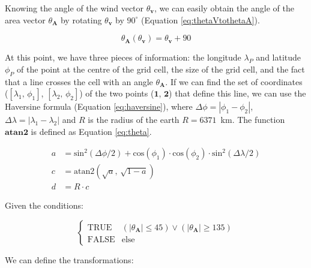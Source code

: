         Knowing the angle of the wind vector $\theta_{\mathbf{v}}$, we can easily obtain the angle of the area vector $\theta_{\mathbf{A}}$ by rotating $\theta_{\mathbf{v}}$ by $90^\circ$ (Equation \ref{eq:thetaVtothetaA}). 

        \begin{equation}
        \label{eq:thetaVtothetaA}
            \theta_{\mathbf{A}}(\theta_{\mathbf{v}}) = \theta_{\mathbf{v}} + 90
        \end{equation}

        At this point, we have three pieces of information: the longitude $\lambda_P$ and latitude $\phi_P$ of the point at the centre of the grid cell, the size of the grid cell, and the fact that a line crosses the cell with an angle $\theta_{\mathbf{A}}$. If we can find the set of coordinates ($\left[\lambda_1,\, \phi_1\right]$, $\left[\lambda_2,\, \phi_2\right]$)  of the two points ($\mathbf{1}$, $\mathbf{2}$) that define this line, we can use the Haversine formula (Equation \ref{eq:haversine}), where $\Delta \phi = |\phi_1 - \phi_2|$, $\Delta \lambda = |\lambda_1 - \lambda_2|$ and $R$ is the radius of the earth $R = 6371$~km. The function $\mathbf{atan2}$ is defined as Equation \ref{eq:theta}.

        \begin{equation}
            \label{eq:haversine}
            \begin{aligned}
                a &= \text{sin}^2 (\Delta \phi / 2) + \text{cos}(\phi_1) \cdot \text{cos}(\phi_2) \cdot\text{sin}^2(\Delta \lambda /2) \\
                c &= \text{atan2}\left( \sqrt{a},\, \sqrt{1-a}\right) \\
                d &= R \cdot c
            \end{aligned}
        \end{equation}

        Given the conditions:
        
        \begin{equation}
            \begin{cases} 
                \text{TRUE} & (|\theta_{\mathbf{A}}| \leq 45) \vee \left(| \theta_{\mathbf{A}}| \geq 135 \right) \\
                \text{FALSE} & \text{else}
            \end{cases}
        \end{equation}
        
        We can define the transformations:
        
